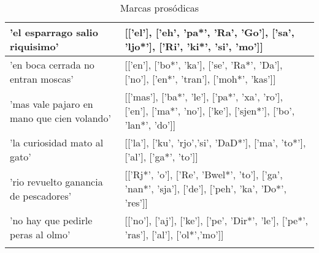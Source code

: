\begin{longtable}{| p{} | p{} |}
'el esparrago salio riquisimo' & [['el'], ['eh', 'pa*', 'Ra', 'Go'], ['sa', 'ljo*'], ['Ri', 'ki*', 'si', 'mo']] \\ \hline
'en boca cerrada no entran moscas' & [['en'], ['bo*', 'ka'], ['se', 'Ra*', 'Da'], ['no'], ['en*', 'tran'], ['moh*', 'kas']] \\ \hline
'mas vale pajaro en mano que cien volando' & [['mas'], ['ba*', 'le'], ['pa*', 'xa', 'ro'], ['en'], ['ma*', 'no'], ['ke'], ['sjen*'], ['bo', 'lan*', 'do']] \\ \hline
'la curiosidad mato al gato' & [['la'], ['ku', 'rjo','si', 'DaD*'], ['ma', 'to*'], ['al'], ['ga*', 'to']] \\ \hline
'rio revuelto ganancia de pescadores' & [['Rj*', 'o'], ['Re', 'Bwel*', 'to'], ['ga', 'nan*', 'sja'], ['de'], ['peh', 'ka', 'Do*', 'res']] \\ \hline
'no hay que pedirle peras al olmo' & [['no'], ['aj'], ['ke'], ['pe', 'Dir*', 'le'], ['pe*', 'ras'], ['al'], ['ol*','mo']] \\ \hline

\caption{Marcas prosódicas} 
\label{tab:myfirstlongtable}
\end{longtable}